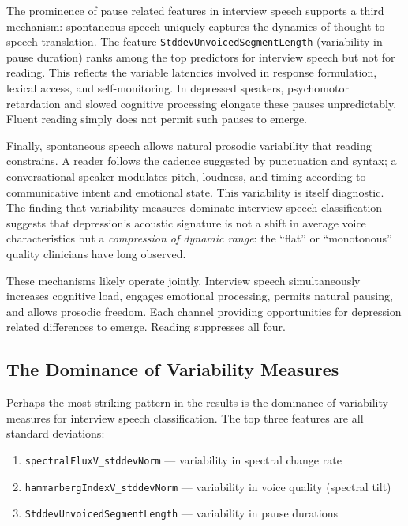 The prominence of pause related features in interview speech supports a third mechanism: spontaneous speech uniquely captures the dynamics of thought-to-speech translation. The feature \texttt{StddevUnvoicedSegmentLength} (variability in pause duration) ranks among the top predictors for interview speech but not for reading. This reflects the variable latencies involved in response formulation, lexical access, and self-monitoring. In depressed speakers, psychomotor retardation and slowed cognitive processing elongate these pauses unpredictably. Fluent reading simply does not permit such pauses to emerge.

Finally, spontaneous speech allows natural prosodic variability that reading constrains. A reader follows the cadence suggested by punctuation and syntax; a conversational speaker modulates pitch, loudness, and timing according to communicative intent and emotional state. This variability is itself diagnostic. The finding that variability measures dominate interview speech classification suggests that depression's acoustic signature is not a shift in average voice characteristics but a \textit{compression of dynamic range}: the ``flat'' or ``monotonous'' quality clinicians have long observed.

These mechanisms likely operate jointly. Interview speech simultaneously increases cognitive load, engages emotional processing, permits natural pausing, and allows prosodic freedom. Each channel providing opportunities for depression related differences to emerge. Reading suppresses all four.

\subsection{The Dominance of Variability Measures}

Perhaps the most striking pattern in the results is the dominance of variability measures for interview speech classification. The top three features are all standard deviations:

\begin{enumerate}
    \item \texttt{spectralFluxV\_stddevNorm} — variability in spectral change rate
    \item \texttt{hammarbergIndexV\_stddevNorm} — variability in voice quality (spectral tilt)
    \item \texttt{StddevUnvoicedSegmentLength} — variability in pause durations
\end{enumerate}

